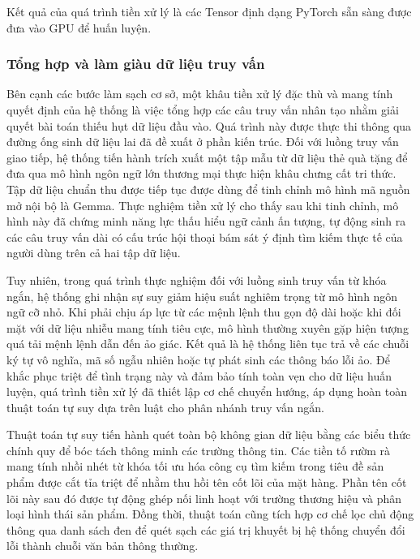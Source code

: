 Kết quả của quá trình tiền xử lý là các Tensor định dạng PyTorch sẵn sàng được đưa
vào GPU để huấn luyện.

\subsubsection{Tổng hợp và làm giàu dữ liệu truy vấn}

Bên cạnh các bước làm sạch cơ sở, một khâu tiền xử lý đặc thù và mang tính quyết định của hệ thống là việc tổng hợp các câu truy vấn nhân tạo nhằm giải quyết bài toán thiếu hụt dữ liệu đầu vào. Quá trình này được thực thi thông qua đường ống sinh dữ liệu lai đã đề xuất ở phần kiến trúc. Đối với luồng truy vấn giao tiếp, hệ thống tiến hành trích xuất một tập mẫu từ dữ liệu thẻ quà tặng để đưa qua mô hình ngôn ngữ lớn thương mại thực hiện khâu chưng cất tri thức. Tập dữ liệu chuẩn thu được tiếp tục được dùng để tinh chỉnh mô hình mã nguồn mở nội bộ là Gemma. Thực nghiệm tiền xử lý cho thấy sau khi tinh chỉnh, mô hình này đã chứng minh năng lực thấu hiểu ngữ cảnh ấn tượng, tự động sinh ra các câu truy vấn dài có cấu trúc hội thoại bám sát ý định tìm kiếm thực tế của người dùng trên cả hai tập dữ liệu.

Tuy nhiên, trong quá trình thực nghiệm đối với luồng sinh truy vấn từ khóa ngắn, hệ thống ghi nhận sự suy giảm hiệu suất nghiêm trọng từ mô hình ngôn ngữ cỡ nhỏ. Khi phải chịu áp lực từ các mệnh lệnh thu gọn độ dài hoặc khi đối mặt với dữ liệu nhiễu mang tính tiêu cực, mô hình thường xuyên gặp hiện tượng quá tải mệnh lệnh dẫn đến ảo giác. Kết quả là hệ thống liên tục trả về các chuỗi ký tự vô nghĩa, mã số ngẫu nhiên hoặc tự phát sinh các thông báo lỗi ảo. Để khắc phục triệt để tình trạng này và đảm bảo tính toàn vẹn cho dữ liệu huấn luyện, quá trình tiền xử lý đã thiết lập cơ chế chuyển hướng, áp dụng hoàn toàn thuật toán tự suy dựa trên luật cho phân nhánh truy vấn ngắn.

Thuật toán tự suy tiến hành quét toàn bộ không gian dữ liệu bằng các biểu thức chính quy để bóc tách thông minh các trường thông tin. Các tiền tố rườm rà mang tính nhồi nhét từ khóa tối ưu hóa công cụ tìm kiếm trong tiêu đề sản phẩm được cắt tỉa triệt để nhằm thu hồi tên cốt lõi của mặt hàng. Phần tên cốt lõi này sau đó được tự động ghép nối linh hoạt với trường thương hiệu và phân loại hình thái sản phẩm. Đồng thời, thuật toán cũng tích hợp cơ chế lọc chủ động thông qua danh sách đen để quét sạch các giá trị khuyết bị hệ thống chuyển đổi lỗi thành chuỗi văn bản thông thường. 


